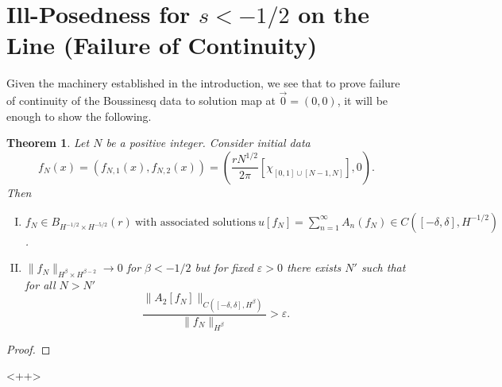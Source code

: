 \documentclass[12pt,reqno]{amsart}
\numberwithin{equation}{section}  %
\newcommand{\ee}{\varepsilon}
\newtheorem{theorem}{Theorem}[section]
\begin{document}
\section{Ill-Posedness for $s < -1/2$ on the Line (Failure of Continuity)} 
Given the machinery established in the introduction, we see that to prove failure of continuity of the Boussinesq data to solution map at $\vec{0} =
(0, 0)$, it will be enough to show the
following.
%
%
%
%
%
%
%
%
%
%
%
\begin{theorem}
  Let $N$ be a positive integer. Consider initial data $$f_{N}(x) =
  (f_{N,1}(x), f_{N,2}(x)) = \left ( \frac{r N^{1/2}}{2 \pi}\left[ \chi_{[0,1] \cup [N-1, N]} \right], 0 \right ).$$ Then 
    \begin{enumerate}[(I)]
      \item{$ f_{N} \in B_{H^{-1/2} \times H^{-5/2}}(r) \ \text{with associated
    solutions}
    \ u[f_{N}] = \sum_{n=1}^{\infty} A_{n}(f_{N}) \in C([-\delta, \delta],
    H^{-1/2})$}.
    \\
  \item
    $\|f_{N}\|_{H^{\beta} \times H^{\beta-2}} \to 0$ for $\beta < -1/2$ but for fixed $\ee > 0$ there exists $N'$ such that for all $N > N'$ 
    $$  \frac{\|A_{2}[f_{N}]\|_{C( [-\delta, \delta], H^{\beta})}}{\| f_{N}
    \|_{H^{\beta}}} > \ee.$$
\end{enumerate}
\end{theorem}
%
%
%
\begin{proof}

\end{proof}
%
%
<++>
%
%
%
%
%
%
%
%
%
%
%
%
%
\end{document}

